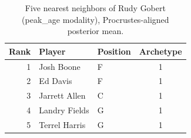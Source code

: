 \begin{table}[htbp]
  \centering\small
  \begin{tabular}{rllc}
    \toprule
    Rank & Player & Position & Archetype \\
    \midrule
    1 & Josh Boone & F & 1 \\
    2 & Ed Davis & F & 1 \\
    3 & Jarrett Allen & C & 1 \\
    4 & Landry Fields & G & 1 \\
    5 & Terrel Harris & G & 1 \\
    \bottomrule
  \end{tabular}
  \caption{Five nearest neighbors of Rudy Gobert (peak_age modality), Procrustes-aligned posterior mean.}
  \label{tab:Rudy_Gobert_neighbors_peak_age}
\end{table}

